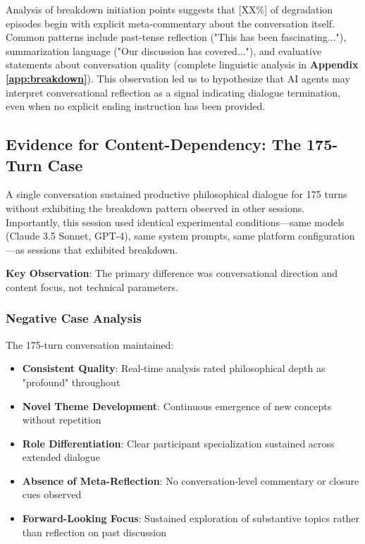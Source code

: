 \documentclass[11pt,letterpaper]{article}
\newcommand{\metaReflectionTriggers}{[XX\%]} %
\newcommand{\negativeCase}{175} %
\begin{document}
Analysis of breakdown initiation points suggests that \metaReflectionTriggers{} of degradation episodes begin with explicit meta-commentary about the conversation itself. Common patterns include past-tense reflection ("This has been fascinating..."), summarization language ("Our discussion has covered..."), and evaluative statements about conversation quality (complete linguistic analysis in \textbf{Appendix \ref{app:breakdown}}). This observation led us to hypothesize that AI agents may interpret conversational reflection as a signal indicating dialogue termination, even when no explicit ending instruction has been provided.

\subsection{Evidence for Content-Dependency: The 175-Turn Case}

A single conversation sustained productive philosophical dialogue for \negativeCase{} turns without exhibiting the breakdown pattern observed in other sessions. Importantly, this session used identical experimental conditions—same models (Claude 3.5 Sonnet, GPT-4), same system prompts, same platform configuration—as sessions that exhibited breakdown.

\textbf{Key Observation}: The primary difference was conversational direction and content focus, not technical parameters.

\subsubsection{Negative Case Analysis}

The \negativeCase{}-turn conversation maintained:
\begin{itemize}
    \item \textbf{Consistent Quality}: Real-time analysis rated philosophical depth as "profound" throughout
    \item \textbf{Novel Theme Development}: Continuous emergence of new concepts without repetition
    \item \textbf{Role Differentiation}: Clear participant specialization sustained across extended dialogue
    \item \textbf{Absence of Meta-Reflection}: No conversation-level commentary or closure cues observed
    \item \textbf{Forward-Looking Focus}: Sustained exploration of substantive topics rather than reflection on past discussion
\end{itemize}
\end{document}
